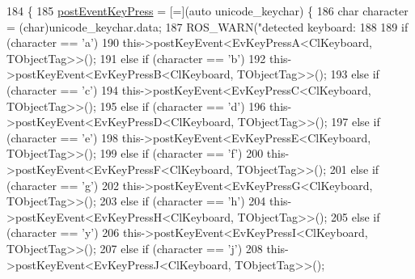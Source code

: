 \begin{DoxyCode}
184         \{
185                 \hyperlink{classsm__three__some_1_1keyboard__client_1_1ClKeyboard_a36efb98dcd78795abf90c9fb00a9f170}{postEventKeyPress} = [=](\textcolor{keyword}{auto} unicode\_keychar) \{
186                         \textcolor{keywordtype}{char} character = (char)unicode\_keychar.data;
187                         ROS\_WARN(\textcolor{stringliteral}{"detected keyboard: %
188 
189                         \textcolor{keywordflow}{if} (character == \textcolor{charliteral}{'a'})
190                                 this->postKeyEvent<EvKeyPressA<ClKeyboard, TObjectTag>>();
191                         \textcolor{keywordflow}{else} \textcolor{keywordflow}{if} (character == \textcolor{charliteral}{'b'})
192                                 this->postKeyEvent<EvKeyPressB<ClKeyboard, TObjectTag>>();
193                         \textcolor{keywordflow}{else} \textcolor{keywordflow}{if} (character == \textcolor{charliteral}{'c'})
194                                 this->postKeyEvent<EvKeyPressC<ClKeyboard, TObjectTag>>();
195                         \textcolor{keywordflow}{else} \textcolor{keywordflow}{if} (character == \textcolor{charliteral}{'d'})
196                                 this->postKeyEvent<EvKeyPressD<ClKeyboard, TObjectTag>>();
197                         \textcolor{keywordflow}{else} \textcolor{keywordflow}{if} (character == \textcolor{charliteral}{'e'})
198                                 this->postKeyEvent<EvKeyPressE<ClKeyboard, TObjectTag>>();
199                         \textcolor{keywordflow}{else} \textcolor{keywordflow}{if} (character == \textcolor{charliteral}{'f'})
200                                 this->postKeyEvent<EvKeyPressF<ClKeyboard, TObjectTag>>();
201                         \textcolor{keywordflow}{else} \textcolor{keywordflow}{if} (character == \textcolor{charliteral}{'g'})
202                                 this->postKeyEvent<EvKeyPressG<ClKeyboard, TObjectTag>>();
203                         \textcolor{keywordflow}{else} \textcolor{keywordflow}{if} (character == \textcolor{charliteral}{'h'})
204                                 this->postKeyEvent<EvKeyPressH<ClKeyboard, TObjectTag>>();
205                         \textcolor{keywordflow}{else} \textcolor{keywordflow}{if} (character == \textcolor{charliteral}{'y'})
206                                 this->postKeyEvent<EvKeyPressI<ClKeyboard, TObjectTag>>();
207                         \textcolor{keywordflow}{else} \textcolor{keywordflow}{if} (character == \textcolor{charliteral}{'j'})
208                                 this->postKeyEvent<EvKeyPressJ<ClKeyboard, TObjectTag>>();
}
\end{DoxyCode}
